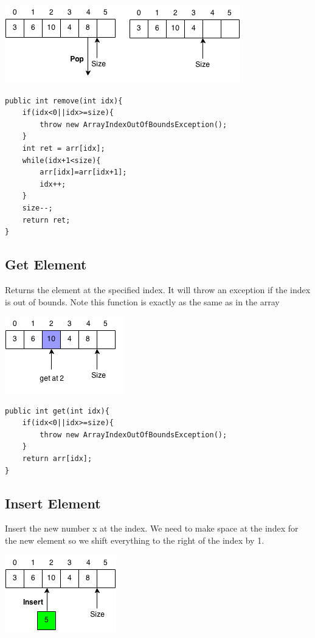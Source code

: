 \documentclass[11pt,oneside]{book}
\makeatletter
\def\maxwidth#1{\ifdim\Gin@nat@width>#1 #1\else\Gin@nat@width\fi}
\makeatother
\begin{document}
\includegraphics[width=\maxwidth{\textwidth}]{vector4.png}

\begin{lstlisting}
public int remove(int idx){
    if(idx<0||idx>=size){
        throw new ArrayIndexOutOfBoundsException();
    }
    int ret = arr[idx];
    while(idx+1<size){
        arr[idx]=arr[idx+1];
        idx++;
    }
    size--;
    return ret;
}
\end{lstlisting}

\subsection{Get Element}

Returns the element at the specified index. It will throw an exception if the index is out of bounds. Note this function is exactly as the same as in the array

\includegraphics[width=\maxwidth{\textwidth}]{vectorget.png}

\begin{lstlisting}
public int get(int idx){
    if(idx<0||idx>=size){
        throw new ArrayIndexOutOfBoundsException();
    }   
    return arr[idx];
}
\end{lstlisting}

\subsection{Insert Element}

Insert the new number x at the index. We need to make space at the index for the new element so we shift everything to the right of the index by 1.

\includegraphics[width=\maxwidth{\textwidth}]{vectorinsert.png}
\end{document}

